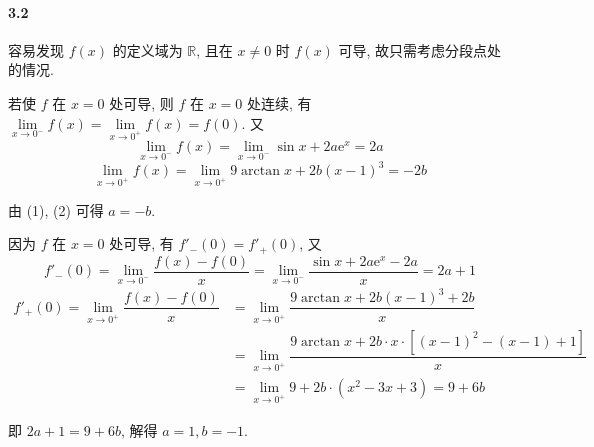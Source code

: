 \paragraph{3.2} 
容易发现 $f(x)$ 的定义域为 $\mathbb{R}$, 且在 $x\neq 0$ 时 $f(x)$ 可导, 故只需考虑分段点处的情况.

若使 $f$ 在 $x=0$ 处可导, 则 $f$ 在 $x=0$ 处连续, 有 $\lim\limits_{x\to 0^{-}}f(x)=\lim\limits_{x\to0^{+}}f(x)=f(0)$. 又
\begin{equation}
\lim_{x\to 0^{-}}f(x)=\lim_{x\to 0^{-}}\sin x+2a\mathrm{e}^x=2a
\end{equation}
\begin{equation}
\lim_{x\to 0^{+}}f(x)=\lim_{x\to 0^{+}}9\arctan x+2b(x-1)^3=-2b
\end{equation}

由 (1), (2) 可得 $a=-b$.

因为 $f$ 在 $x=0$ 处可导, 有 $f'_{-}(0)=f'_{+}(0)$, 又
\begin{equation}
	f'_{-}(0)=\lim_{x\to 0^{-}}\dfrac{f(x)-f(0)}{x}=\lim_{x\to 0^{-}}\dfrac{\sin x+2a\mathrm{e}^x-2a}{x}=2a+1
\end{equation}
\begin{equation}
\begin{aligned}
f'_{+}(0)=\lim_{x\to0^{+}}\dfrac{f(x)-f(0)}{x}&=\lim_{x\to 0^{+}}\dfrac{9\arctan x+2b(x-1)^3+2b}{x}\\
&=\lim_{x\to 0^{+}}\dfrac{9\arctan x+2b\cdot x\cdot\left[(x-1)^2-(x-1)+1\right]}{x}\\
&=\lim_{x\to 0^{+}}9+2b\cdot(x^2-3x+3)=9+6b
\end{aligned}
\end{equation}

即 $2a+1=9+6b$, 解得 $a=1,b=-1$. 

